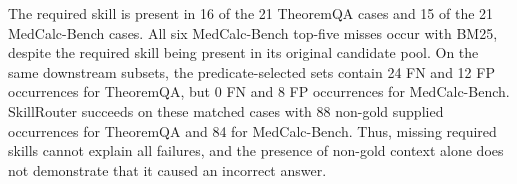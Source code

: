 The required skill is present in 16 of the 21 TheoremQA cases and 15 of the 21 MedCalc-Bench cases. All six MedCalc-Bench top-five misses occur with BM25, despite the required skill being present in its original candidate pool. On the same downstream subsets, the predicate-selected sets contain 24 FN and 12 FP occurrences for TheoremQA, but 0 FN and 8 FP occurrences for MedCalc-Bench. SkillRouter succeeds on these matched cases with 88 non-gold supplied occurrences for TheoremQA and 84 for MedCalc-Bench. Thus, missing required skills cannot explain all failures, and the presence of non-gold context alone does not demonstrate that it caused an incorrect answer.
